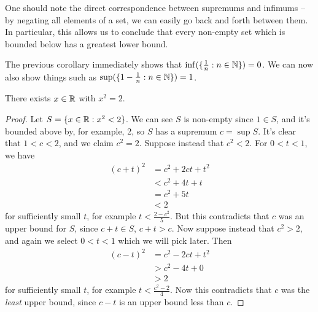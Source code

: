 \documentclass{../template/note}
\begin{document}
    \begin{remark*}
        One should note the direct correspondence between supremums and infimums -- by negating all elements of a set, we can easily go back and forth between them. In particular, this allows us to conclude that every non-empty set which is bounded below has a greatest lower bound.
    \end{remark*}
    
    \begin{corollary}[Corollary\(^2\)]
        The previous corollary immediately shows that \(\inf(\{\frac{1}{n}: n \in \mathbb N\}) = 0\). We can now also show things such as \(\sup(\{1 - \frac{1}{n}: n \in \mathbb N\}) = 1\).
    \end{corollary}
    
    \begin{theorem}
        There exists \(x \in \mathbb R\) with \(x^2 = 2\).
    \end{theorem}
    
    \begin{proof}
        Let \(S = \{x \in \mathbb R: x^2 < 2\}\). We can see \(S\) is non-empty since \(1 \in S\), and it's bounded above by, for example, 2, so \(S\) has a supremum \(c = \sup S\). It's clear that \(1 < c < 2\), and we claim \(c^2 = 2\). Suppose instead that \(c^2 < 2\). For \(0 < t < 1\), we have
        \begin{align*}
            (c+t)^2 &= c^2 + 2ct + t^2 \\
            &< c^2 + 4t + t \\
            &= c^2 + 5t \\
            &< 2
        \end{align*}
        for sufficiently small \(t\), for example \(t < \frac{2-c^2}{5}\). But this contradicts that \(c\) was an upper bound for \(S\), since \(c + t \in S\), \(c + t > c\). Now suppose instead that \(c^2 > 2\), and again we select \(0 < t < 1\) which we will pick later. Then
        \begin{align*}
            (c-t)^2 &= c^2 - 2ct + t^2 \\
            &> c^2 - 4t + 0 \\
            &> 2
        \end{align*}
        for sufficiently small \(t\), for example \(t < \frac{c^2-2}{4}\). Now this contradicts that \(c\) was the \emph{least} upper bound, since \(c-t\) is an upper bound less than \(c\).
    \end{proof}
    
\end{document}
